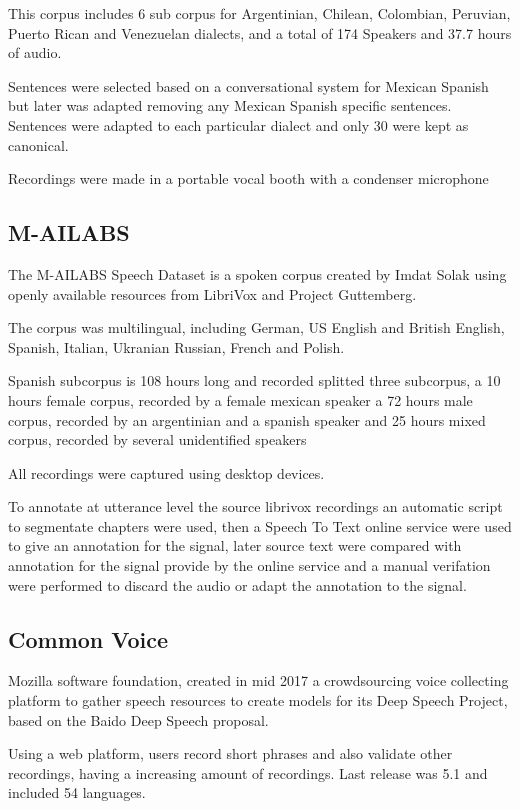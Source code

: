 \documentclass[10pt, a4paper]{article}
\begin{document}
This corpus includes 6 sub corpus for Argentinian, Chilean, Colombian, Peruvian, Puerto Rican and Venezuelan dialects, and a total of 174 Speakers and 37.7 hours of audio.

Sentences were selected based on a conversational system for Mexican Spanish but later was adapted removing any Mexican Spanish specific sentences. Sentences were adapted to each particular dialect and only 30 were kept as canonical.

Recordings were made in a portable vocal booth with a condenser microphone \cite{googleTTSLatinAmericanSpanishCorpus}

\subsection{M-AILABS}

The M-AILABS Speech Dataset is a spoken corpus created by Imdat Solak using openly available resources from LibriVox and Project Guttemberg.

The corpus was multilingual, including German, US English and British English, Spanish, Italian, Ukranian Russian, French and Polish.

Spanish subcorpus is 108 hours long and recorded splitted three subcorpus, a 10 hours female corpus, recorded by a female mexican speaker a 72 hours male corpus, recorded by an argentinian and a spanish speaker and  25 hours mixed corpus, recorded by several unidentified speakers

All recordings were captured using desktop devices.

To annotate at utterance level the source librivox recordings an automatic script to segmentate chapters were used, then a Speech To Text online service were used to give an annotation for the signal, later source text were compared with annotation for the signal provide by the online service and a manual verifation were performed to discard the audio or adapt the annotation to the signal.

\subsection{Common Voice}

Mozilla software foundation, created in mid 2017 a crowdsourcing voice collecting platform to gather speech resources to create models for its Deep Speech Project, based on the Baido Deep Speech \cite{deepspeeh} proposal.

Using a web platform, users record short phrases and also validate other recordings, having a increasing amount of recordings. Last release was 5.1 and included  54 languages.
\end{document}
